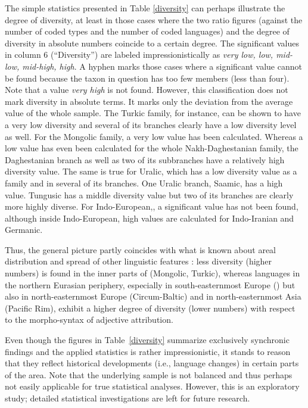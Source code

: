 The simple statistics presented in Table \ref{diversity} can perhaps illustrate the degree of diversity, at least in those cases where the two ratio figures (against the number of coded types and the number of coded languages) and the degree of diversity in absolute numbers coincide to a certain degree. The significant values in column 6 (“Diversity”) are labeled impressionistically as \textit{very low, low, mid-low, mid-high, high}. A hyphen marks those cases where a significant value cannot be found because the taxon in question has too few members (less than four). Note that a value \textit{very high} is not found. 
 However, this classification does not mark diversity in absolute terms. It marks only the deviation from the average value of the whole sample. The Turkic family, for instance, can be shown to have a very low diversity and several of its branches clearly have a low diversity level as well. For the Mongolic family, a very low value has been calculated. Whereas a low value has even been calculated for the whole Nakh-Daghestanian family, the Daghestanian branch as well as two of its subbranches have a relatively high diversity value. The same is true for Uralic, which has a low diversity value as a family and in several of its branches. One Uralic branch, Saamic, has a high value. Tungusic has a middle diversity value but two of its branches are clearly more highly diverse. For Indo-European,, a significant value has not been found, although inside Indo-European, high values are calculated for Indo-Iranian and Germanic.

Thus, the general picture partly coincides with what is known about areal distribution and spread of other linguistic features \citep[cf., e.g.,][]{nichols1992}: less diversity (higher numbers) is found in the inner parts of  (Mongolic, Turkic), whereas languages in the northern Eurasian periphery, especially in south-easternmost Europe () but also in north-easternmost Europe (Circum-Baltic) and in north-easternmost Asia (Pacific Rim), exhibit a higher degree of diversity (lower numbers) with respect to the morpho-syntax of adjective attribution.

Even though the figures in Table~\ref{diversity} summarize exclusively synchronic findings and the applied statistics is rather impressionistic, it stands to reason that they reflect historical developments (i.e., language changes) in certain parts of the area. Note that the underlying sample is not balanced and thus perhaps not easily applicable for true statistical analyses. However, this is an exploratory study; detailed statistical investigations are left for future research.

